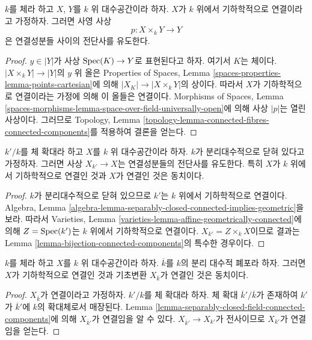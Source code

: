 \begin{lemma}
\label{lemma-bijection-connected-components}
$k$를 체라 하고 $X$, $Y$를 $k$ 위 대수공간이라 하자.
$X$가 $k$ 위에서 기하학적으로 연결이라고 가정하자.
그러면 사영 사상
$$
p : X \times_k Y \longrightarrow Y
$$
은 연결성분들 사이의 전단사를 유도한다.
\end{lemma}

\begin{proof}
$y \in |Y|$가 사상 $\mathop{\mathrm{Spec}}(K) \to Y$로 표현된다고 하자. 여기서 $K$는
체이다. $|X \times_k Y| \to |Y|$의 $y$ 위 올은 Properties of Spaces,
Lemma \ref{spaces-properties-lemma-points-cartesian}에 의해
$|X_K| \to |X \times_k Y|$의 상이다. 따라서 $X$가 기하학적으로
연결이라는 가정에 의해 이 올들은 연결이다. Morphisms of Spaces, Lemma
\ref{spaces-morphisms-lemma-space-over-field-universally-open}에 의해 사상
$|p|$는 열린 사상이다. 그러므로 Topology, Lemma
\ref{topology-lemma-connected-fibres-connected-components}를 적용하여
결론을 얻는다.
\end{proof}

\begin{lemma}
\label{lemma-separably-closed-field-connected-components}
$k'/k$를 체 확대라 하고 $X$를 $k$ 위 대수공간이라 하자. $k$가
분리대수적으로 닫혀 있다고 가정하자. 그러면 사상 $X_{k'} \to X$는
연결성분들의 전단사를 유도한다. 특히 $X$가 $k$ 위에서 기하학적으로
연결인 것과 $X$가 연결인 것은 동치이다.
\end{lemma}

\begin{proof}
$k$가 분리대수적으로 닫혀 있으므로 $k'$는 $k$ 위에서 기하학적으로
연결이다. Algebra, Lemma
\ref{algebra-lemma-separably-closed-connected-implies-geometric}을 보라.
따라서 Varieties, Lemma
\ref{varieties-lemma-affine-geometrically-connected}에 의해
$Z = \mathop{\mathrm{Spec}}(k')$는 $k$ 위에서 기하학적으로 연결이다.
$X_{k'} = Z \times_k X$이므로 결과는 Lemma
\ref{lemma-bijection-connected-components}의 특수한 경우이다.
\end{proof}

\begin{lemma}
\label{lemma-characterize-geometrically-connected}
$k$를 체라 하고 $X$를 $k$ 위 대수공간이라 하자.
$\overline{k}$를 $k$의 분리 대수적 폐포라 하자. 그러면 $X$가
기하학적으로 연결인 것과 기초변환 $X_{\overline{k}}$가 연결인 것은
동치이다.
\end{lemma}

\begin{proof}
$X_{\overline{k}}$가 연결이라고 가정하자. $k'/k$를 체 확대라 하자.
체 확대 $\overline{k}'/\overline{k}$가 존재하여 $k'$가 $\overline{k}'$에
$k$의 확대체로서 매장된다. Lemma
\ref{lemma-separably-closed-field-connected-components}에 의해
$X_{\overline{k}'}$가 연결임을 알 수 있다.
$X_{\overline{k}'} \to X_{k'}$가 전사이므로 $X_{k'}$가 연결임을 얻는다.
\end{proof}


